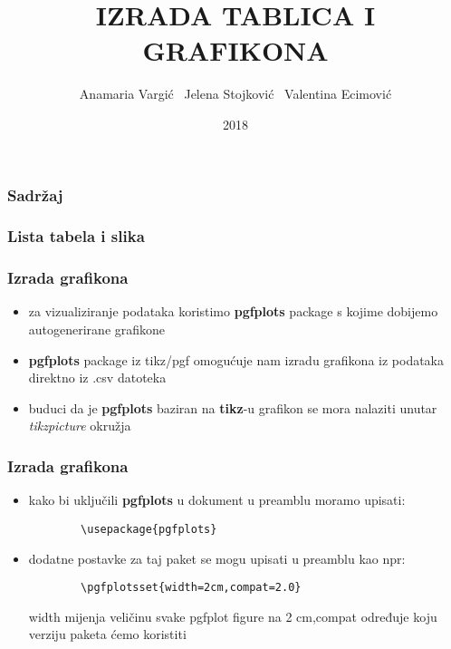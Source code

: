 \documentclass[16pt]{beamer}
\title[IZRADA TABLICA I GRAFIKONA\hspace{20mm} \insertframenumber/\inserttotalframenumber]{IZRADA TABLICA I GRAFIKONA}
\author{Anamaria Vargić \  Jelena Stojković  \  Valentina Ecimović}
\institute{Tehnički fakultet u Rijeci - Računarstvo}
\date{2018}
\begin{document}
\frame{\titlepage}
\begin{frame}

\frametitle{Sadržaj}

\tableofcontents

\end{frame}
\begin{frame}
\frametitle{Lista tabela i slika}


\listoffigures
 
\listoftables
 
\newpage
 
\end{frame} 

\begin{frame}

\frametitle{Izrada grafikona}

\begin{itemize}
\setlength\itemsep{1em}

\item za vizualiziranje podataka koristimo \textbf{pgfplots} package s kojime dobijemo autogenerirane grafikone

\item \textbf{pgfplots} package iz tikz/pgf omogućuje nam izradu grafikona iz podataka direktno iz .csv datoteka 
\item buduci da je \textbf{pgfplots} baziran na \textbf{tikz}-u grafikon se mora nalaziti unutar \textit{tikzpicture} okružja


\end{itemize}

\end{frame}



\begin{frame}[fragile]
\frametitle{Izrada grafikona}

\begin{itemize}
\setlength\itemsep{1em}

\item kako bi uključili \textbf{pgfplots} u dokument u preamblu moramo upisati:
	\begin{verbatim}
		\usepackage{pgfplots}
	\end{verbatim}
\item dodatne postavke za taj paket se mogu upisati u preamblu kao npr:
	\begin{verbatim}
		\pgfplotsset{width=2cm,compat=2.0}
	\end{verbatim}
	width mijenja veličinu svake pgfplot figure na 2 cm,compat određuje koju verziju paketa ćemo koristiti
		
	
\end{itemize}

\end{frame}
\end{document}
